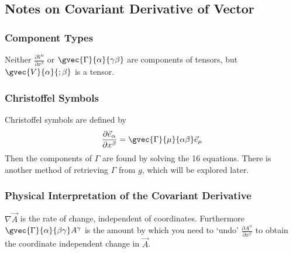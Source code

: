 \subsection{Notes on Covariant Derivative of Vector}
\subsubsection{Component Types}
Neither $\frac{\partial V^\alpha}{\partial x^\beta}$ or $\gvec{\Gamma}{\alpha}{\gamma \beta}$ are components of tensors, but $\gvec{V}{\alpha}{;\beta}$ is a tensor.
\subsubsection{Christoffel Symbols}
Christoffel symbols are defined by
$$ \frac{\partial \vec{e}_\alpha}{\partial x^\beta} = \gvec{\Gamma}{\mu}{\alpha \beta} \vec{e}_\mu $$
Then the components of $\Gamma$ are found by solving the 16 equations. There is another method of retrieving $\Gamma$ from $g$, which will be explored later.
\subsubsection{Physical Interpretation of the Covariant Derivative}
$\nabla \vec{A}$ is the rate of change, independent of coordinates. Furthermore $\gvec{\Gamma}{\alpha}{\beta \gamma} A^\gamma$ is the amount by which you need to `undo' $\frac{\partial A^\alpha}{\partial x^\beta}$ to obtain the coordinate independent change in $\vec{A}$.

